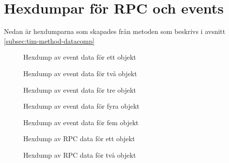 \chapter{Hexdumpar för RPC och events}
\label{app:hexdumps}

Nedan är hexdumparna som skapades från metoden som beskrivs i avsnitt \ref{subsec:tim-method-datacomp}

\begin{figure}
    \scriptsize
    \center
    
    \caption{Hexdump av event data för ett objekt}
    \label{fig:tim-eventdata1}
\end{figure}

\begin{figure}
    \scriptsize
    \center
    
    \caption{Hexdump av event data för två objekt}
    \label{fig:tim-eventdata2}
\end{figure}

\begin{figure}
    \scriptsize
    \center
    
    \caption{Hexdump av event data för tre objekt}
    \label{fig:tim-eventdata3}
\end{figure}

\begin{figure}
    \scriptsize
    \center
    
    \caption{Hexdump av event data för fyra objekt}
    \label{fig:tim-eventdata4}
\end{figure}

\begin{figure}
    \scriptsize
    \center
    
    \caption{Hexdump av event data för fem objekt}
    \label{fig:tim-eventdata5}
\end{figure}

\begin{figure}
    \scriptsize
    \center
    
    \caption{Hexdump av RPC data för ett objekt}
    \label{fig:tim-rpcdata1}
\end{figure}

\begin{figure}
    \scriptsize
    \center
    
    \caption{Hexdump av RPC data för två objekt}
    \label{fig:tim-rpcdata2}
\end{figure}

